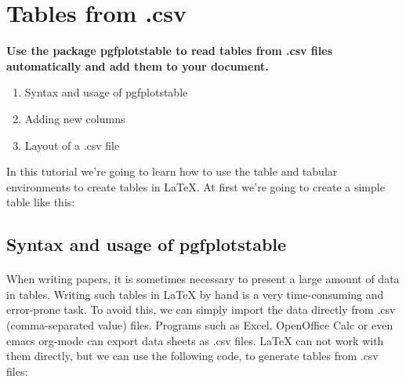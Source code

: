 
\maketitle
\newpage
\section{Tables from .csv}
  \textbf{
    Use the package pgfplotstable to read tables from .csv files automatically and add them to your document.
  }
  \begin{enumerate} %
    \item Syntax and usage of pgfplotstable
    \item Adding new columns
    \item Layout of a .csv file
  \end{enumerate} 
  In this tutorial we're going to learn how to use the table and tabular environments to create tables in LaTeX. At first we're going to create a simple table like this:
  
  \subsection{Syntax and usage of pgfplotstable}
  \paragraph{}
  When writing papers, it is sometimes necessary to present a large amount of data in tables. Writing such tables in LaTeX by hand is a very time-consuming and error-prone task. To avoid this, we can simply import the data directly from .csv (comma-separated value) files. Programs such as Excel, OpenOffice Calc or even emacs org-mode can export data sheets as .csv files. LaTeX can not work with them directly, but we can use the following code, to generate tables from .csv files:
  
